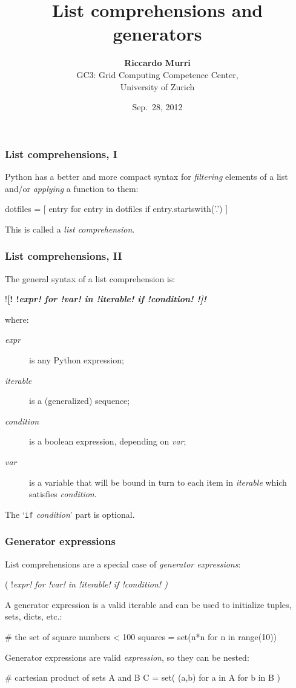 \documentclass[english,serif,mathserif,xcolor=pdftex,dvipsnames,table]{beamer}
\title[Part 7]{%
  List comprehensions and generators
}
\author[R. Murri]{%
  \textbf{Riccardo Murri} \\
  GC3: Grid Computing Competence Center, \\
  University of Zurich
}
\date{Sep.~28, 2012}
\begin{document}
\maketitle

\begin{frame}[fragile]
  \frametitle{List comprehensions, I}
  Python has a better and more compact syntax for \emph{filtering} elements
  of a list and/or \emph{applying} a function to them:
  \begin{python}
dotfiles = [ entry for entry in dotfiles 
             if entry.startswith('.') ]
  \end{python}
  
  \+ 
  This is called a \emph{list comprehension}.
\end{frame}


\begin{frame}[fragile]
  \frametitle{List comprehensions, II}
  \def\e{\ttfamily\itshape}
  
  The general syntax of a list comprehension is:
  \begin{python}
    !\bf[! !\e expr! for !\e var! in !\e iterable! if !\e condition! !\bf]!
  \end{python}
  where:
  \begin{description}
  \item[\e expr] is any Python expression;
  \item[\e iterable] is a (generalized) sequence;
  \item[\e condition] is a boolean expression, depending on
    {\e var};
  \item[\e var] is a variable that will be bound in turn to each item
    in {\e iterable} which satisfies {\e condition}.
  \end{description}

  \+
  The `{\lstinline|if| \e condition}' part is optional.
\end{frame}


\begin{frame}[fragile]
  \frametitle{Generator expressions}
  \def\e{\ttfamily\itshape}

  List comprehensions are a special case of \emph{generator expressions}:
  \begin{python}
    ( !\e expr! for !\e var! in !\e iterable! if !\e condition! )
  \end{python}

  \+
  A generator expression is a valid iterable and can be used to
  initialize tuples, sets, dicts, etc.:
  \begin{python}
    # the set of square numbers < 100
    squares = set(n*n for n in range(10))
  \end{python}

  \+
  Generator expressions are valid \emph{expression}, so they can be nested:
  \begin{python}
    # cartesian product of sets A and B
    C = set( (a,b) for a in A for b in B )
  \end{python}
\end{frame}
\end{document}
